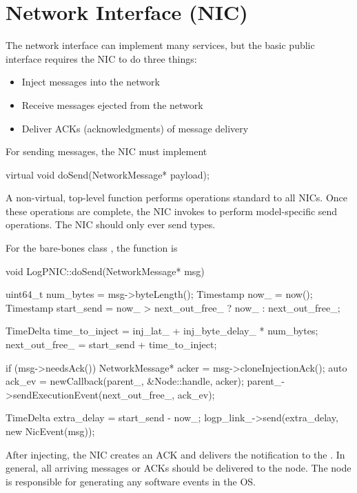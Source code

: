 \section{Network Interface (NIC)}\label{sec:nic}
The network interface can implement many services, but the basic public interface requires the NIC to do three things:

\begin{itemize}
\item Inject messages into the network
\item Receive messages ejected from the network
\item Deliver ACKs (acknowledgments) of message delivery
\end{itemize}

For sending messages, the NIC must implement

\begin{CppCode}
  virtual void doSend(NetworkMessage* payload);
\end{CppCode}
A non-virtual, top-level  function performs operations standard to all NICs.
Once these operations are complete, the NIC invokes  to perform model-specific send operations.
The NIC should only ever send  types.

For the bare-bones class , the function is

\begin{CppCode}
void LogPNIC::doSend(NetworkMessage* msg)
{
  uint64_t num_bytes = msg->byteLength();
  Timestamp now_ = now();
  Timestamp start_send = now_ > next_out_free_ ? now_ : next_out_free_;

  TimeDelta time_to_inject = inj_lat_ + inj_byte_delay_ * num_bytes;
  next_out_free_ = start_send + time_to_inject;

  if (msg->needsAck()){
    NetworkMessage* acker = msg->cloneInjectionAck();
    auto ack_ev = newCallback(parent_, &Node::handle, acker);
    parent_->sendExecutionEvent(next_out_free_, ack_ev);
  }

  TimeDelta extra_delay = start_send - now_;
  logp_link_->send(extra_delay, new NicEvent(msg));
}
\end{CppCode}
After injecting, the NIC creates an ACK and delivers the notification to the \nodecls.
In general, all arriving messages or ACKs should be delivered to the node.
The node is responsible for generating any software events in the OS.

